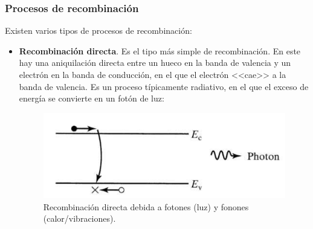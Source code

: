 \subsubsection{Procesos de recombinación}

Existen varios tipos de procesos de recombinación:

\begin{itemize}
	\item \textbf{Recombinación directa}. Es el tipo más simple de recombinación. En este hay una aniquilación directa entre un hueco en la banda de valencia y un electrón en la banda de conducción, en el que el electrón <<cae>> a la banda de valencia. Es un proceso típicamente radiativo, en el que el exceso de energía se convierte en un fotón de luz:

	\begin{figure}[h!] \centering
		\includegraphics[width=0.5\linewidth]{Cuerpo/Ch_02/02_R_Directa.png}
		\caption{Recombinación directa debida a fotones (luz) y fonones (calor/vibraciones).}
	\end{figure}
	

\end{itemize}
